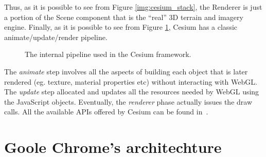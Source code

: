 Thus, as it is possible to see from Figure \ref{img:cesium_stack},
the Renderer is just a portion of the Scene
component that is the ``real'' 3D terrain and imagery engine.
Finally, as it is possible to see from Figure \ref{img:cesium_pipeline},
Cesium has a classic animate/update/render pipeline.
\begin{figure}[!htb]\label{img:cesium_pipeline}
    \caption{The internal pipeline used in the Cesium framework.}
\end{figure}

The \emph{animate} step involves all the aspects of building each object that is
later rendered (eg. texture, material properties etc) without interacting with
WebGL. The \emph{update} step allocated and updates all the resources needed by
WebGL using the JavaScript objects. Eventually, the \emph{renderer} phase actually
issues the draw calls. All the available APIs offered by Cesium can be found
in~\cite{cesiumapi}.



\section{Goole Chrome's architechture}
